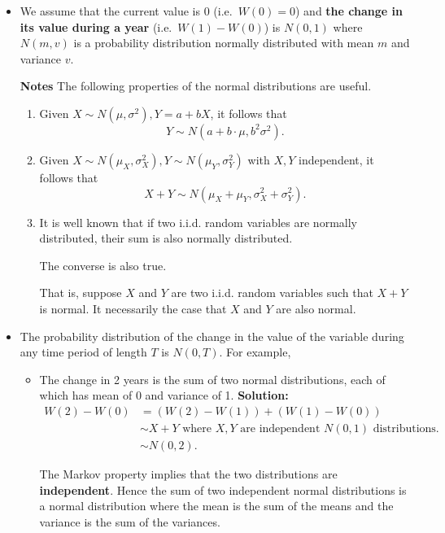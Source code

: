 \documentclass[landscape, 20pt]{extreport}
\theoremstyle{definition}
\theoremstyle{definition}
\theoremstyle{definition}
\theoremstyle{definition}
\theoremstyle{remark}
\begin{document}
\begin{itemize}
\item
  We assume that the current value is 0 (i.e.~\(W(0) = 0\)) and \textbf{the
  change in its value during a year} (i.e.~\(W(1) - W(0)\)) is \(N(0,1)\)
  where \(N(m,v)\) is a probability distribution normally distributed
  with mean \(m\) and variance \(v\).

  \textbf{Notes} The following properties of the normal distributions are
  useful.

  \begin{enumerate}
  \def\labelenumi{\arabic{enumi}.}
  \item
    Given \(X \sim N(\mu, \sigma^2), Y = a + bX\), it follows that
    \[Y \sim N(a + b\cdot \mu, b^2 \sigma^2).\]
  \item
    Given \(X \sim N(\mu_X, \sigma_X^2), Y \sim N(\mu_Y, \sigma_Y^2)\)
    with \(X, Y\) independent, it follows that
    \[X + Y  \sim N(\mu_X + \mu_Y, \sigma_X^2 + \sigma_Y^2).\]
  \item
    It is well known that if two i.i.d. random variables are
    normally distributed, their sum is also normally distributed.

    The converse is also true.

    That is, suppose \(X\) and \(Y\) are two i.i.d. random variables
    such that \(X + Y\) is normal. It necessarily the case that \(X\)
    and \(Y\) are also normal.
  \end{enumerate}
\item
  The probability distribution of the change in the value of the
  variable during any time period of length \(T\) is \(N(0,T)\). For
  example,

  \begin{itemize}
  \item
    The change in 2 years is the sum of two normal distributions,
    each of which has mean of 0 and variance of 1. \textbf{Solution:}
    \[\begin{aligned}
        W(2) - W(0) &= (W(2) - W(1)) +  (W(1) - W(0)) \\
                  &\sim X + Y \text{ where } X, Y \text{ are independent } N(0,1)                   \text{ distributions.}  \\
                  &\sim N(0,2).\end{aligned}\]

    The Markov property implies that the two distributions are
    \textbf{independent}. Hence the sum of two independent normal
    distributions is a normal distribution where the mean is the sum
    of the means and the variance is the sum of the variances.


\end{itemize}
\end{itemize}
\end{document}
